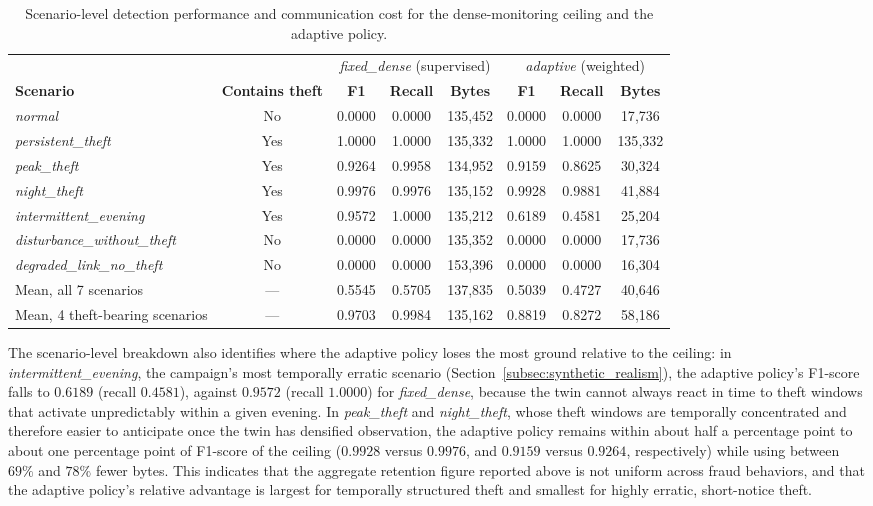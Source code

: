 \documentclass{ieeeaccess}
\begin{document}
\begin{table}[!ht]
\centering
\caption{Scenario-level detection performance and communication cost for the dense-monitoring ceiling and the adaptive policy.}
\label{tab:scenario_breakdown}
\begin{tabular}{lccccccc}
\hline
& & \multicolumn{3}{c}{\textit{fixed\_dense} (supervised)} & \multicolumn{3}{c}{\textit{adaptive} (weighted)} \\
\textbf{Scenario} & \textbf{Contains theft} & \textbf{F1} & \textbf{Recall} & \textbf{Bytes} & \textbf{F1} & \textbf{Recall} & \textbf{Bytes} \\
\hline
\textit{normal} & No & 0.0000 & 0.0000 & 135{,}452 & 0.0000 & 0.0000 & 17{,}736 \\
\textit{persistent\_theft} & Yes & 1.0000 & 1.0000 & 135{,}332 & 1.0000 & 1.0000 & 135{,}332 \\
\textit{peak\_theft} & Yes & 0.9264 & 0.9958 & 134{,}952 & 0.9159 & 0.8625 & 30{,}324 \\
\textit{night\_theft} & Yes & 0.9976 & 0.9976 & 135{,}152 & 0.9928 & 0.9881 & 41{,}884 \\
\textit{intermittent\_evening} & Yes & 0.9572 & 1.0000 & 135{,}212 & 0.6189 & 0.4581 & 25{,}204 \\
\textit{disturbance\_without\_theft} & No & 0.0000 & 0.0000 & 135{,}352 & 0.0000 & 0.0000 & 17{,}736 \\
\textit{degraded\_link\_no\_theft} & No & 0.0000 & 0.0000 & 153{,}396 & 0.0000 & 0.0000 & 16{,}304 \\
\hline
Mean, all 7 scenarios & --- & 0.5545 & 0.5705 & 137{,}835 & 0.5039 & 0.4727 & 40{,}646 \\
Mean, 4 theft-bearing scenarios & --- & 0.9703 & 0.9984 & 135{,}162 & 0.8819 & 0.8272 & 58{,}186 \\
\hline
\end{tabular}
\end{table}

The scenario-level breakdown also identifies where the adaptive policy loses the most ground relative to the ceiling: in \textit{intermittent\_evening}, the campaign's most temporally erratic scenario (Section~\ref{subsec:synthetic_realism}), the adaptive policy's F1-score falls to $0.6189$ (recall $0.4581$), against $0.9572$ (recall $1.0000$) for \textit{fixed\_dense}, because the twin cannot always react in time to theft windows that activate unpredictably within a given evening. In \textit{peak\_theft} and \textit{night\_theft}, whose theft windows are temporally concentrated and therefore easier to anticipate once the twin has densified observation, the adaptive policy remains within about half a percentage point to about one percentage point of F1-score of the ceiling ($0.9928$ versus $0.9976$, and $0.9159$ versus $0.9264$, respectively) while using between $69\%$ and $78\%$ fewer bytes. This indicates that the aggregate retention figure reported above is not uniform across fraud behaviors, and that the adaptive policy's relative advantage is largest for temporally structured theft and smallest for highly erratic, short-notice theft.
\end{document}

